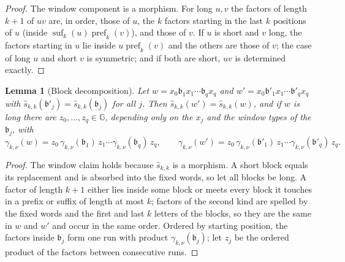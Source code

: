 \documentclass[11pt]{article}
\numberwithin{equation}{section}
\theoremstyle{plain}
\newtheorem{lemma}[theorem]{Lemma}
\theoremstyle{definition}
\theoremstyle{remark}
\theoremstyle{plain}
\begin{document}
\begin{proof}
The window component is a morphism.  For long $u,v$ the factors of length $k+1$
of $uv$ are, in order, those of $u$, the $k$ factors starting in the last $k$
positions of $u$ (inside $\operatorname{suf}_k(u)\operatorname{pref}_k(v)$), and
those of $v$.  If $u$ is short and $v$ long, the factors starting in $u$ lie inside
$u\operatorname{pref}_k(v)$ and the others are those of $v$; the case of long $u$ and
short $v$ is symmetric; and if both are short, $uv$ is determined exactly.
\end{proof}

\begin{lemma}[Block decomposition]
\label{lem:local-group-blocks}
Let $w=x_0\mathfrak b_1x_1\cdots\mathfrak b_qx_q$ and $w'=x_0\mathfrak b'_1x_1\cdots\mathfrak b'_qx_q$ with
$\widehat s_{k,k}(\mathfrak b'_j)=\widehat s_{k,k}(\mathfrak b_j)$ for all $j$.  Then
$\widehat s_{k,k}(w')=\widehat s_{k,k}(w)$, and if $w$ is long there are
$z_0,\ldots,z_q\in {\mathbb G}$, depending only on the $x_j$ and the window types of the
$\mathfrak b_j$, with
\[
 \gamma_{k,\nu}(w)=z_0\,\gamma_{k,\nu}(\mathfrak b_1)\,z_1\cdots\gamma_{k,\nu}(\mathfrak b_q)\,z_q,
 \qquad
 \gamma_{k,\nu}(w')=z_0\,\gamma_{k,\nu}(\mathfrak b'_1)\,z_1\cdots\gamma_{k,\nu}(\mathfrak b'_q)\,z_q .
\]
\end{lemma}

\begin{proof}
The window claim holds because $\widehat s_{k,k}$ is a morphism.  A short block equals
its replacement and is absorbed into the fixed words, so let all blocks be long.  A
factor of length $k+1$ either lies inside some block or meets every block it touches
in a prefix or suffix of length at most $k$; factors of the second kind are spelled by
the fixed words and the first and last $k$ letters of the blocks, so they are the same
in $w$ and $w'$ and occur in the same order.  Ordered by starting position, the
factors inside $\mathfrak b_j$ form one run with product $\gamma_{k,\nu}(\mathfrak b_j)$; let
$z_j$ be the ordered product of the factors between consecutive runs.
\end{proof}
\end{document}
